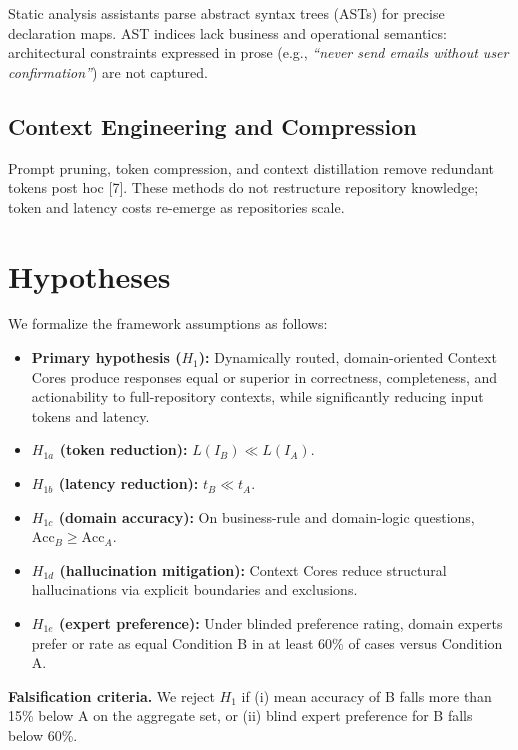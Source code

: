 \documentclass[11pt]{article}
\providecommand{\tightlist}{%
  \setlength{\itemsep}{2pt}%
  \setlength{\parskip}{0pt}%
}
\begin{document}
Static analysis assistants parse abstract syntax trees (ASTs) for
precise declaration maps. AST indices lack business and operational
semantics: architectural constraints expressed in prose (e.g.,
\emph{``never send emails without user confirmation''}) are not
captured.

\subsection{Context Engineering and
Compression}\label{context-engineering-and-compression}

Prompt pruning, token compression, and context distillation remove
redundant tokens post hoc {[}7{]}. These methods do not restructure
repository knowledge; token and latency costs re-emerge as repositories
scale.

\section{Hypotheses}\label{hypotheses}

We formalize the framework assumptions as follows:

\begin{itemize}
\tightlist
\item
  \textbf{Primary hypothesis (\(H_1\)):} Dynamically routed,
  domain-oriented Context Cores produce responses equal or superior in
  correctness, completeness, and actionability to full-repository
  contexts, while significantly reducing input tokens and latency.
\item
  \textbf{\(H_{1a}\) (token reduction):} \(L(I_B) \ll L(I_A)\).
\item
  \textbf{\(H_{1b}\) (latency reduction):} \(t_B \ll t_A\).
\item
  \textbf{\(H_{1c}\) (domain accuracy):} On business-rule and
  domain-logic questions, \(\text{Acc}_B \ge \text{Acc}_A\).
\item
  \textbf{\(H_{1d}\) (hallucination mitigation):} Context Cores reduce
  structural hallucinations via explicit boundaries and exclusions.
\item
  \textbf{\(H_{1e}\) (expert preference):} Under blinded preference
  rating, domain experts prefer or rate as equal Condition B in at least
  60\% of cases versus Condition A.
\end{itemize}

\textbf{Falsification criteria.} We reject \(H_1\) if (i) mean accuracy
of B falls more than 15\% below A on the aggregate set, or (ii) blind
expert preference for B falls below 60\%.
\end{document}
